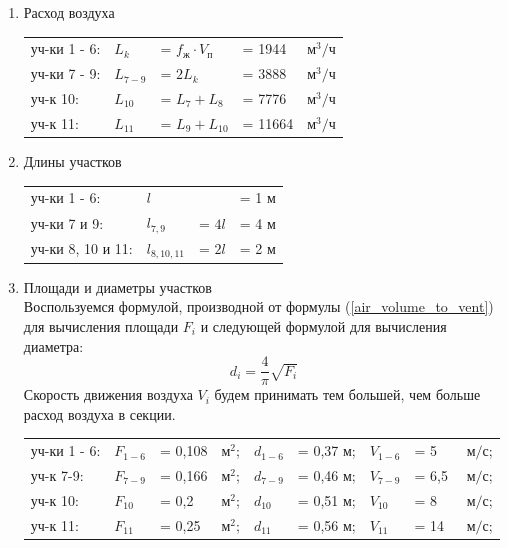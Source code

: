 \begin{enumerate}
    \item   Расход воздуха \\
            \begin{tabular}{lllll}
                уч-ки 1 - 6:    & $L_k $    & = $f_\text{ж} \cdot V_\text{п}$   & = 1944    & $\text{м}^3 / \text{ч}$ \\
                уч-ки 7 - 9:    & $L_{7-9}$ & = $2 L_k$                         & = 3888    & $\text{м}^3 / \text{ч}$ \\
                уч-к 10:        & $L_{10}$  & = $L_{7} + L_{8}$                 & = 7776    & $\text{м}^3 / \text{ч}$ \\
                уч-к 11:        & $L_{11}$  & = $L_{9} + L_{10}$                & = 11664   & $\text{м}^3 / \text{ч}$ \\
            \end{tabular}

    \item   Длины участков \\
            \begin{tabular}{llll}
                уч-ки 1 - 6:        & $l$           &           & = 1 м \\
                уч-ки 7 и 9:        & $l_{7,9}$     & = $4 l$   & = 4 м \\
                уч-ки 8, 10 и 11:   & $l_{8,10,11}$ & = $2 l$   & = 2 м \\
            \end{tabular}

    \item   Площади и диаметры участков \\
            Воспользуемся формулой, производной от формулы (\ref{air_volume_to_vent})
            для вычисления площади $F_i$ и следующей формулой для вычисления диаметра:
            $$
                d_i = \frac{4}{\pi} \sqrt{F_i}
            $$
            Скорость движения воздуха $V_i$ будем принимать тем большей, чем больше
            расход воздуха в секции.
            \begin{tabular}{lllllllll}
                уч-ки 1 - 6:    & $F_{1-6}$ & = 0,108   & $\text{м}^2$; & $d_{1-6}$ & = 0,37 м; & $V_{1-6}$ & = 5   & $\text{ м/с}$;  \\
                уч-к 7-9:       & $F_{7-9}$ & = 0,166   & $\text{м}^2$; & $d_{7-9}$ & = 0,46 м; & $V_{7-9}$   & = 6,5 & $\text{ м/с}$;  \\
                уч-к 10:        & $F_{10}$  & = 0,2     & $\text{м}^2$; & $d_{10}$  & = 0,51 м; & $V_{10}$  & = 8   & $\text{ м/с}$;  \\
                уч-к 11:        & $F_{11}$  & = 0,25    & $\text{м}^2$; & $d_{11}$  & = 0,56 м; & $V_{11}$  & = 14  & $\text{ м/с}$;  \\
            \end{tabular}


\end{enumerate}
